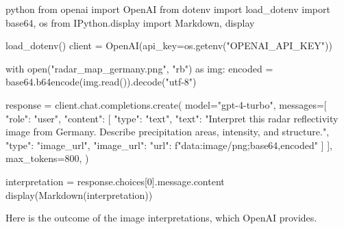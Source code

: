 \begin{codeonly}{python}
from openai import OpenAI
from dotenv import load_dotenv
import base64, os
from IPython.display import Markdown, display

load_dotenv()
client = OpenAI(api_key=os.getenv("OPENAI_API_KEY"))

with open("radar_map_germany.png", "rb") as img:
    encoded = base64.b64encode(img.read()).decode("utf-8")

response = client.chat.completions.create(
    model="gpt-4-turbo",
    messages=[
        {"role": "user", "content": [
            {"type": "text", "text": "Interpret this radar reflectivity image from Germany. Describe precipitation areas, intensity, and structure."},
            {"type": "image_url", "image_url": {
                "url": f"data:image/png;base64,{encoded}"}
            }
        ]}
    ],
    max_tokens=800,
)

interpretation = response.choices[0].message.content
display(Markdown(interpretation))
\end{codeonly}

Here is the outcome of the image interpretations, which OpenAI provides. 

